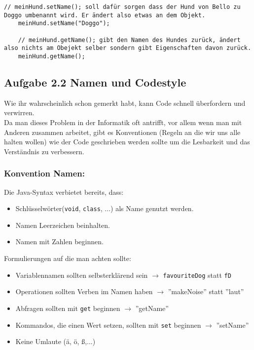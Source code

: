 \begin{lstlisting}[title=\textbf{Kommando/Abfrage Beispiel}]
	// meinHund.setName(); soll dafür sorgen dass der Hund von Bello zu Doggo umbenannt wird. Er ändert also etwas an dem Objekt.
	meinHund.setName("Doggo");
	
	// meinHund.getName(); gibt den Namen des Hundes zurück, ändert also nichts am Obejekt selber sondern gibt Eigenschaften davon zurück.
	meinHund.getName();
\end{lstlisting}

\subsection*{Aufgabe 2.2 Namen und Codestyle}
Wie ihr wahrscheinlich schon gemerkt habt, kann Code schnell überfordern und verwirren.\\
Da man dieses Problem in der Informatik oft antrifft, vor allem wenn man mit Anderen zusammen arbeitet, gibt es Konventionen (Regeln an die wir uns alle halten wollen) wie der Code geschrieben werden sollte um die Lesbarkeit und das Verständnis zu verbessern.

\vspace{5mm}

\subsubsection*{Konvention Namen:}

\begin{Infobox}
	Die Java-Syntax verbietet bereits, dass:

	\begin{itemize}
		\item Schlüsselwörter(\lstinline{void}, \lstinline{class}, ...) als Name genutzt werden.
		\item Namen Leerzeichen beinhalten.
		\item Namen mit Zahlen beginnen.
	\end{itemize}
\end{Infobox}
\vspace{5mm}
\begin{Infobox}
	Formulierungen auf die man achten sollte:
	\begin{itemize}
		\item Variablennamen sollten selbsterklärend sein $\rightarrow$ \lstinline{favouriteDog} statt \lstinline{fD}
		\item Operationen sollten Verben im Namen haben $\rightarrow$ ''makeNoise'' statt ''laut''
		\item Abfragen sollten mit \lstinline{get} beginnen $\rightarrow$ ''getName''
		\item Kommandos, die einen Wert setzen, sollten mit \lstinline{set} beginnen $\rightarrow$ ''setName''
		\item Keine Umlaute (ä, ö, ß,...)

	\end{itemize}
\end{Infobox}

